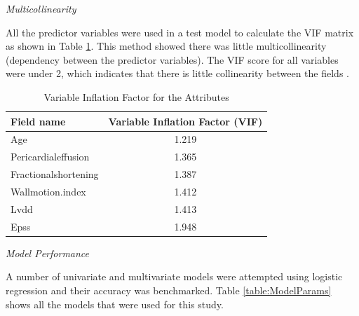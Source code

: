 \documentclass[11pt]{article}
\begin{document}
{\it Multicollinearity}

All the predictor variables were used in a test model to calculate the VIF matrix as shown in Table \ref{table:VIFScores}. This method showed there was little multicollinearity (dependency between the predictor variables). The VIF score for all variables were under 2, which indicates that there is little collinearity between the fields \cite{vif}. 

\begin{table}[htbp]
\centering
\begin{tabular}{@{}lc@{}}
\toprule
\textbf{Field name}  & \multicolumn{1}{l}{\textbf{Variable Inflation Factor (VIF)}} \\ \midrule
Age                  & 1.219                                                        \\
Pericardialeffusion  & 1.365                                                        \\
Fractionalshortening & 1.387                                                        \\
Wallmotion.index     & 1.412                                                        \\
Lvdd                 & 1.413                                                        \\
Epss                 & 1.948                                                        \\ \bottomrule
\end{tabular}
\caption{Variable Inflation Factor for the Attributes}
\label{table:VIFScores}
\end{table}

{\it Model Performance}

A number of univariate and multivariate models were attempted using logistic regression and their accuracy was benchmarked. Table \ref{table:ModelParams} shows all the models that were used for this study. 
\end{document}
